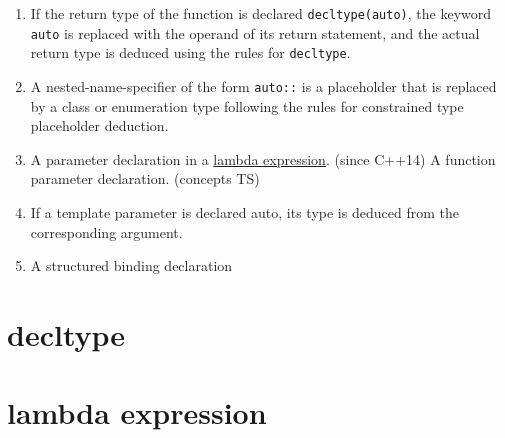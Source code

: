 \begin{enumerate}
	\item If the return type of the function is declared \lstinline[style=CppStyleInline]|decltype(auto)|, the keyword \lstinline[style=CppStyleInline]|auto| is replaced with the operand of its return statement, and the actual return type is deduced using the rules for \lstinline[style=CppStyleInline]|decltype|.
	
	\item A nested-name-specifier of the form \lstinline[style=CppStyleInline]|auto::| is a placeholder that is replaced by a class or enumeration type following the rules for constrained type placeholder deduction.
	
	\item A parameter declaration in a \hyperref[lambdaExpression]{lambda expression}. (since C++14) A function parameter declaration. (concepts TS)
	
	\item If a template parameter is declared auto, its type is deduced from the corresponding argument.
	
	\item A structured binding declaration
\end{enumerate}

\section{decltype}\label{decltype}
\section{lambda expression}\label{lambdaExpression}